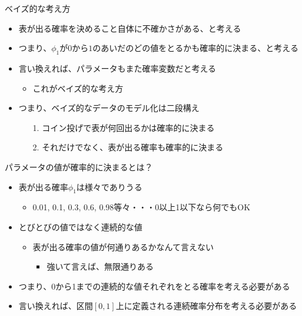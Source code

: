 \documentclass[aspectratio=169,unicode,dvipdfmx,14pt]{beamer}
\begin{document}
\begin{frame}{ベイズ的な考え方}
\begin{itemize}
\item 表が出る確率を決めること自体に不確かさがある、と考える
\item つまり、$\phi_1$が$0$から$1$のあいだのどの値をとるかも確率的に決まる、と考える
\item 言い換えれば、パラメータもまた確率変数だと考える
\begin{itemize}
\item これがベイズ的な考え方
\end{itemize}
\item つまり、ベイズ的なデータのモデル化は二段構え
\begin{itemize}
\item[1.] コイン投げで表が何回出るかは確率的に決まる
\item[2.] それだけでなく、表が出る確率も確率的に決まる
\end{itemize}
\end{itemize}
\end{frame}

\begin{frame}{パラメータの値が確率的に決まるとは？}
\begin{itemize}
\item 表が出る確率$\phi_1$は様々でありうる
\begin{itemize}
\item 0.01, 0.1, 0.3, 0.6, 0.98等々・・・0以上1以下なら何でもOK
\end{itemize}
\item とびとびの値ではなく連続的な値
\begin{itemize}
\item 表が出る確率の値が何通りあるかなんて言えない
\begin{itemize}
\item 強いて言えば、無限通りある
\end{itemize}
\end{itemize}
\item つまり、0から1までの連続的な値それぞれをとる確率を考える必要がある
\item 言い換えれば、区間$[0,1]$上に定義される連続確率分布を考える必要がある
\end{itemize}
\end{frame}
\end{document}
